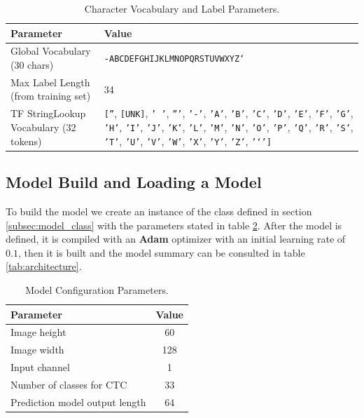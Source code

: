 \documentclass[11pt,letterpaper]{article}
\begin{document}
	\begin{table}[!h]
		\centering
		\begin{tabular}{|l|p{10cm}|}
			\hline
			\textbf{Parameter} & \textbf{Value} \\
			\hline
			Global Vocabulary (30 chars) & \texttt{-ABCDEFGHIJKLMNOPQRSTUVWXYZ` } \\
			\hline
			Max Label Length (from training set) & 34 \\
			\hline
			TF StringLookup Vocabulary (32 tokens) &
			\texttt{[''}, \texttt{[UNK]}, \texttt{' '}, \texttt{'''}, \texttt{'-'}, \texttt{'A'}, \texttt{'B'}, \texttt{'C'}, \texttt{'D'}, \texttt{'E'}, \texttt{'F'}, \texttt{'G'}, \texttt{'H'}, \texttt{'I'}, \texttt{'J'}, \texttt{'K'}, \texttt{'L'}, \texttt{'M'}, \texttt{'N'}, \texttt{'O'}, \texttt{'P'}, \texttt{'Q'}, \texttt{'R'}, \texttt{'S'}, \texttt{'T'}, \texttt{'U'}, \texttt{'V'}, \texttt{'W'}, \texttt{'X'}, \texttt{'Y'}, \texttt{'Z'}, \texttt{'`']} \\
			\hline
		\end{tabular}
		\caption{Character Vocabulary and Label Parameters.}
		\label{tab:vocab_params}
	\end{table}
	
	\newpage
	
	\subsection{Model Build and Loading a Model}
	To build the model we create an instance of the class defined in section \ref{subsec:model_class} with the parameters stated in table \ref{tab:model_config}. After the model is defined, it is compiled with an \textbf{Adam} optimizer with an initial learning rate of $0.1$, then it is built and the model summary can be consulted in table \ref{tab:architecture}.
	
	\begin{table}[!h]
		\centering
		\begin{tabular}{|l|c|}
			\hline
			\textbf{Parameter} & \textbf{Value} \\
			\hline
			Image height & 60 \\
			Image width & 128 \\
			Input channel & 1 \\
			Number of classes for CTC & 33 \\
			Prediction model output length & 64 \\
			\hline
		\end{tabular}
		\caption{Model Configuration Parameters.}
		\label{tab:model_config}
	\end{table}
	
\end{document}
